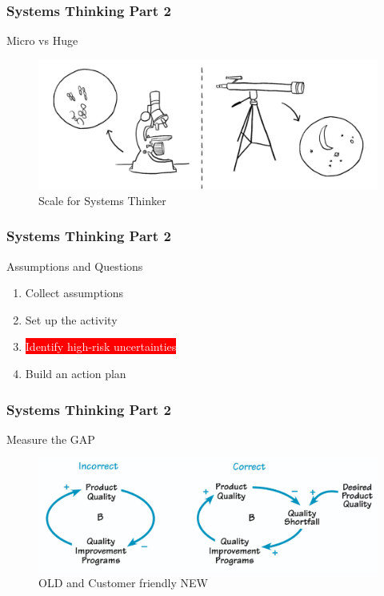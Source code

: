 \newpage

\begin{frame}
\frametitle{ Systems Thinking  Part 2 }
\begin{block}{ Micro vs Huge   }

 
\begin{figure}
\includegraphics[scale=0.56]{pic/scale1.PNG}
\caption{ Scale for Systems Thinker  }
\label{Layer1}
\end{figure}

\end{block}
\end{frame}



\newpage
\begin{frame}
\frametitle{ Systems Thinking  Part 2 }
\begin{block}{ Assumptions and Questions}

\begin{enumerate}
    \item  Collect assumptions
    \item Set up the activity
    \item  \colorbox{red}{ \textcolor{white}{ Identify high-risk uncertainties } }  
    \item  Build an action plan
\end{enumerate}

\end{block}
\end{frame}


\newpage

\begin{frame}
\frametitle{ Systems Thinking  Part 2 }
\begin{block}{ Measure the GAP }

 
\begin{figure}
\includegraphics[scale=0.46]{pic/correct1.PNG}
\caption{  OLD and  Customer friendly NEW  }
\label{Layer1}
\end{figure}

\end{block}
\end{frame}


